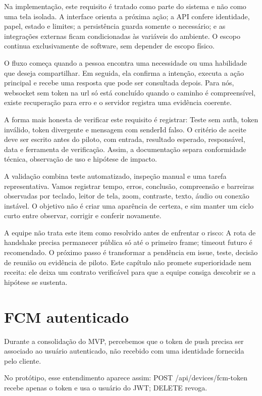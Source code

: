 \documentclass[12pt,oneside,a4paper,article]{abntex2}
\begin{document}
Na implementação, este requisito é tratado como parte do sistema e não como uma tela isolada. A interface orienta a próxima ação; a API confere identidade, papel, estado e limites; a persistência guarda somente o necessário; e as integrações externas ficam condicionadas às variáveis do ambiente. O escopo continua exclusivamente de software, sem depender de escopo físico.

O fluxo começa quando a pessoa encontra uma necessidade ou uma habilidade que deseja compartilhar. Em seguida, ela confirma a intenção, executa a ação principal e recebe uma resposta que pode ser consultada depois. Para nós, websocket sem token na url só está concluído quando o caminho é compreensível, existe recuperação para erro e o servidor registra uma evidência coerente.

A forma mais honesta de verificar este requisito é registrar: Teste sem auth, token inválido, token divergente e mensagem com senderId falso. O critério de aceite deve ser escrito antes do piloto, com entrada, resultado esperado, responsável, data e ferramenta de verificação. Assim, a documentação separa conformidade técnica, observação de uso e hipótese de impacto.

A validação combina teste automatizado, inspeção manual e uma tarefa representativa. Vamos registrar tempo, erros, conclusão, compreensão e barreiras observadas por teclado, leitor de tela, zoom, contraste, texto, áudio ou conexão instável. O objetivo não é criar uma aparência de certeza, e sim manter um ciclo curto entre observar, corrigir e conferir novamente.

A equipe não trata este item como resolvido antes de enfrentar o risco: A rota de handshake precisa permanecer pública só até o primeiro frame; timeout futuro é recomendado. O próximo passo é transformar a pendência em issue, teste, decisão de reunião ou evidência de piloto. Este capítulo não promete superioridade nem receita: ele deixa um contrato verificável para que a equipe consiga descobrir se a hipótese se sustenta.

\section{FCM autenticado}
Durante a consolidação do MVP, percebemos que o token de push precisa ser associado ao usuário autenticado, não recebido com uma identidade fornecida pelo cliente.

No protótipo, esse entendimento aparece assim: POST /api/devices/fcm-token recebe apenas o token e usa o usuário do JWT; DELETE revoga.
\end{document}
